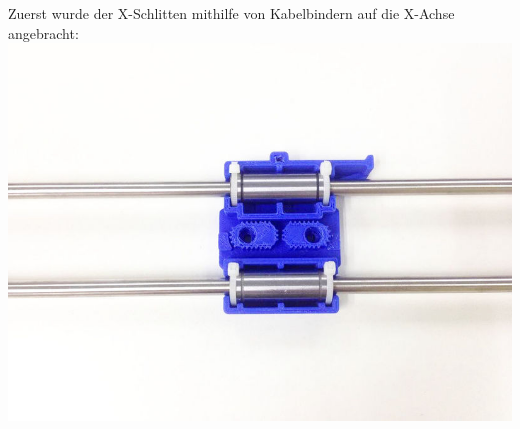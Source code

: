 Zuerst wurde der X-Schlitten mithilfe von Kabelbindern auf die X-Achse angebracht:\\
\includegraphics[clip=true, width=\textwidth]{Bilder/X_Assembly_2.jpg}